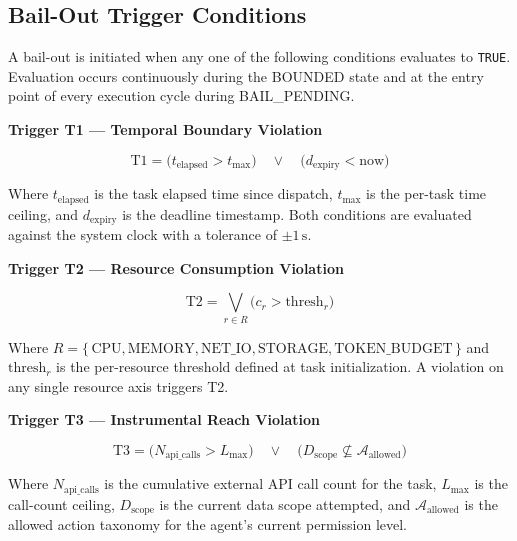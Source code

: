 
\subsection{Bail-Out Trigger Conditions}

A bail-out is initiated when any one of the following conditions evaluates to \texttt{TRUE}. Evaluation occurs continuously during the BOUNDED state and at the entry point of every execution cycle during BAIL\_PENDING.

\bigskip
\noindent\textbf{Trigger T1 — Temporal Boundary Violation}

\begin{equation}
\text{T1} = \bigl(t_{\text{elapsed}} > t_{\text{max}}\bigr) \quad \lor \quad \bigl(d_{\text{expiry}} < \text{now}\bigr)
\end{equation}

Where $t_{\text{elapsed}}$ is the task elapsed time since dispatch, $t_{\text{max}}$ is the per-task time ceiling, and $d_{\text{expiry}}$ is the deadline timestamp. Both conditions are evaluated against the system clock with a tolerance of $\pm 1\,\text{s}$.

\bigskip
\noindent\textbf{Trigger T2 — Resource Consumption Violation}

\begin{equation}
\text{T2} = \bigvee_{r \in R} \bigl(c_r > \text{thresh}_r\bigr)
\end{equation}

Where $R = \{\,\text{CPU}, \text{MEMORY}, \text{NET\_IO}, \text{STORAGE}, \text{TOKEN\_BUDGET}\,\}$ and $\text{thresh}_r$ is the per-resource threshold defined at task initialization. A violation on any single resource axis triggers T2.

\bigskip
\noindent\textbf{Trigger T3 — Instrumental Reach Violation}

\begin{equation}
\text{T3} = \bigl(N_{\text{api\_calls}} > L_{\text{max}}\bigr) \quad \lor \quad \bigl(D_{\text{scope}} \not\subseteq \mathcal{A}_{\text{allowed}}\bigr)
\end{equation}

Where $N_{\text{api\_calls}}$ is the cumulative external API call count for the task, $L_{\text{max}}$ is the call-count ceiling, $D_{\text{scope}}$ is the current data scope attempted, and $\mathcal{A}_{\text{allowed}}$ is the allowed action taxonomy for the agent's current permission level.

